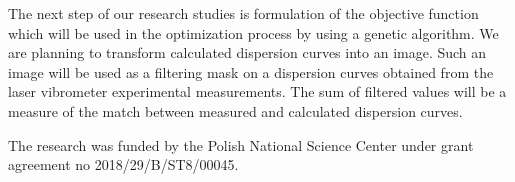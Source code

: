 \documentclass[]{spie}  %
\begin{document}
 The next step of our research studies is formulation of the objective function which will be used in the optimization process by using a genetic algorithm. 
 We are planning to transform calculated dispersion curves into an image.
 Such an image will be used as a filtering mask on a dispersion curves obtained from the laser vibrometer experimental measurements.
 The sum of filtered values will be a measure of the match between measured and calculated dispersion curves.
 
\appendix    %


\acknowledgments %
 
The research was funded by the Polish National Science Center under grant agreement 
no 2018/29/B/ST8/00045. 

\end{document}
